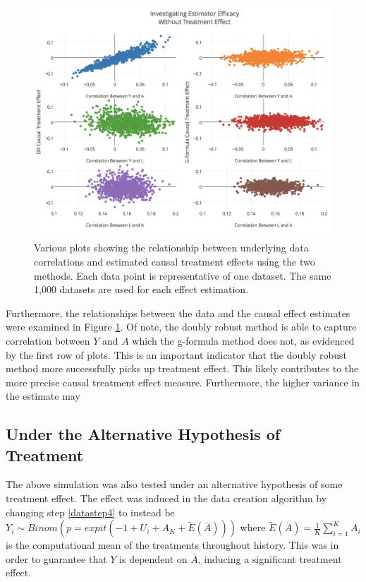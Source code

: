  
\begin{figure}[h!]
\begin{centering}
\includegraphics[width = \linewidth]{figures/correlation.png}
\caption[Scatterplots of relationships between estimates and data correlations under the null hypothesis]{Various plots showing the relationship between underlying data correlations and estimated causal treatment effects using the two methods.  Each data point is representative of one dataset.  The same 1,000 datasets are used for each effect estimation.}
\label{correlation}
\end{centering}
\end{figure}

Furthermore, the relationships between the data and the causal effect estimates were examined in Figure \ref{correlation}.  Of note, the doubly robust method is able to capture correlation between $Y$ and $A$ which the g-formula method does not, as evidenced by the first row of plots.  This is an important indicator that the doubly robust method more successfully picks up treatment effect.  This likely contributes to the more precise causal treatment effect measure.  Furthermore, the higher variance in the estimate may 


\subsection{Under the Alternative Hypothesis of Treatment} \label{alternative}
The above simulation was also tested under an alternative hypothesis of some treatment effect.  The effect was induced in the data creation algorithm by changing step \ref{datastep4} to instead be $Y_i \sim Binom(p = expit(-1+U_i + A_K + \tilde{E}(\overline{A})))$ where $\tilde{E}(\overline{A}) = \frac{1}{K} \sum_{i=1}^K A_i $ is the computational mean of the treatments throughout history.  This was in order to guarantee that $Y$ is dependent on $\overline{A}$, inducing a significant treatment effect.  

